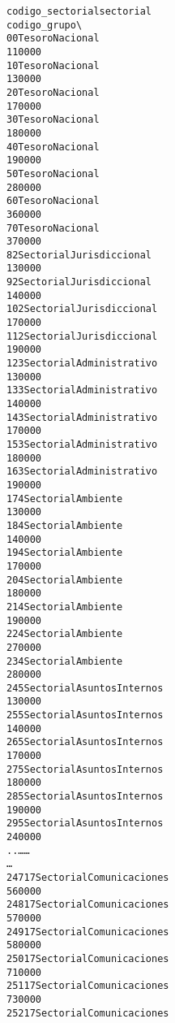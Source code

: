 \documentclass[letterpaper,10pt,english]{/usr/local/lib/python2.7/dist-packages/sphinx/texinputs/sphinxhowto}
\newenvironment{InvisibleVerbatim}
        {\begin{mdframed}[leftmargin=0.1\linewidth,innerleftmargin=3pt,innerrightmargin=3pt, userdefinedwidth=1\linewidth, linewidth=0pt, linecolor=white, usetwoside=false]}
        {\end{mdframed}}
\begin{document}
\begin{InvisibleVerbatim}
\begin{alltt}
     codigo\_sectorial                               sectorial
codigo\_grupo  \textbackslash{}
0                   0                         Tesoro Nacional
110000
1                   0                         Tesoro Nacional
130000
2                   0                         Tesoro Nacional
170000
3                   0                         Tesoro Nacional
180000
4                   0                         Tesoro Nacional
190000
5                   0                         Tesoro Nacional
280000
6                   0                         Tesoro Nacional
360000
7                   0                         Tesoro Nacional
370000
8                   2                Sectorial Jurisdiccional
130000
9                   2                Sectorial Jurisdiccional
140000
10                  2                Sectorial Jurisdiccional
170000
11                  2                Sectorial Jurisdiccional
190000
12                  3                Sectorial Administrativo
130000
13                  3                Sectorial Administrativo
140000
14                  3                Sectorial Administrativo
170000
15                  3                Sectorial Administrativo
180000
16                  3                Sectorial Administrativo
190000
17                  4                      Sectorial Ambiente
130000
18                  4                      Sectorial Ambiente
140000
19                  4                      Sectorial Ambiente
170000
20                  4                      Sectorial Ambiente
180000
21                  4                      Sectorial Ambiente
190000
22                  4                      Sectorial Ambiente
270000
23                  4                      Sectorial Ambiente
280000
24                  5              Sectorial Asuntos Internos
130000
25                  5              Sectorial Asuntos Internos
140000
26                  5              Sectorial Asuntos Internos
170000
27                  5              Sectorial Asuntos Internos
180000
28                  5              Sectorial Asuntos Internos
190000
29                  5              Sectorial Asuntos Internos
240000
..                \ldots                                     \ldots
\ldots
247                17               Sectorial Comunicaciones
560000
248                17               Sectorial Comunicaciones
570000
249                17               Sectorial Comunicaciones
580000
250                17               Sectorial Comunicaciones
710000
251                17               Sectorial Comunicaciones
730000
252                17               Sectorial Comunicaciones

\end{alltt}
\end{InvisibleVerbatim}
\end{document}
